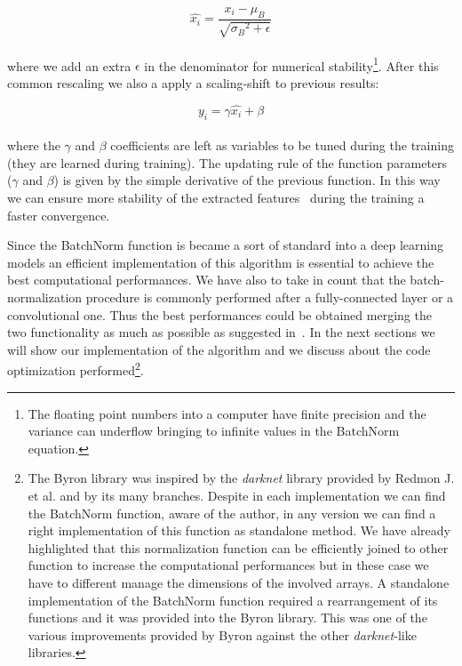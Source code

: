 \documentclass{standalone}
\begin{document}
$$
\hat{x_i} = \frac{x_i - \mu_B}{\sqrt{{\sigma_B}^2 + \epsilon}}
$$
\\
where we add an extra $\epsilon$ in the denominator for numerical stability\footnote{
  The floating point numbers into a computer have finite precision and the variance can underflow bringing to infinite values in the BatchNorm equation.
}.
After this common rescaling we also a apply a scaling-shift to previous results:

$$
y_i = \gamma\hat{x_i} + \beta
$$
\\
where the $\gamma$ and $\beta$ coefficients are left as variables to be tuned during the training (they are learned during training).
The updating rule of the function parameters ($\gamma$ and $\beta$) is given by the simple derivative of the previous function. %
In this way we can ensure more stability of the extracted features~\cite{Lecun2000EffBackProp} during the training a faster convergence.

Since the BatchNorm function is became a sort of standard into a deep learning models an efficient implementation of this algorithm is essential to achieve the best computational performances.
We have also to take in count that the batch-normalization procedure is commonly performed after a fully-connected layer or a convolutional one.
Thus the best performances could be obtained merging the two functionality as much as possible as suggested in~\cite{AlexeyAB}.
In the next sections we will show our implementation of the algorithm and we discuss about the code optimization performed\footnote{
  The Byron library was inspired by the \emph{darknet} library provided by Redmon J. et al. and by its many branches.
  Despite in each implementation we can find the BatchNorm function, aware of the author, in any version we can find a right implementation of this function as standalone method.
  We have already highlighted that this normalization function can be efficiently joined to other function to increase the computational performances but in these case we have to different manage the dimensions of the involved arrays.
  A standalone implementation of the BatchNorm function required a rearrangement of its functions and it was provided into the Byron library.
  This was one of the various improvements provided by Byron against the other \emph{darknet}-like libraries.
}.
\end{document}
